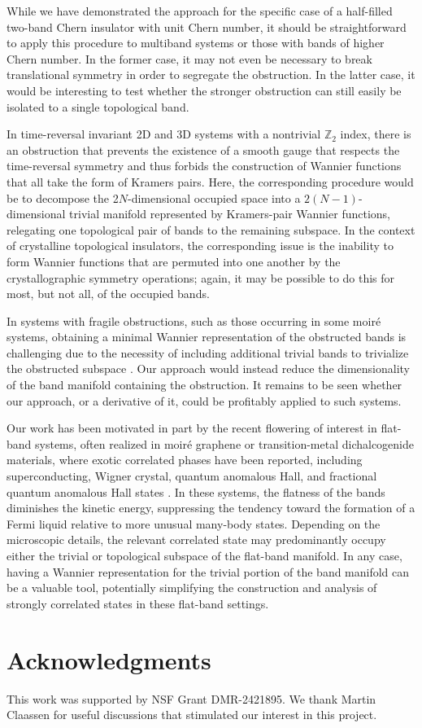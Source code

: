 \documentclass[galley,aps,pra,10pt,amsmath,amssymb,
    superscriptaddress,nofootinbib,longbibliography]{revtex4-2}
\begin{document}
While we have demonstrated the approach for the specific case of a half-filled two-band Chern insulator with unit Chern number, it should be straightforward to apply this procedure to multiband systems or those with bands of higher Chern number. In the former case, it may not even be necessary to break translational symmetry in order to segregate the obstruction. In the latter case, it would be interesting to test whether the stronger obstruction can still easily be isolated to a single topological band. 

In time-reversal invariant 2D and 3D systems with a nontrivial $\mathbb{Z}_2$ index, there is an obstruction that prevents the existence of a smooth gauge that respects the time-reversal symmetry and thus forbids the construction of Wannier functions that all take the form of Kramers pairs. Here, the corresponding procedure would be to decompose the 2$N$-dimensional occupied space into a $2(N-1)$-dimensional trivial manifold represented by Kramers-pair Wannier functions, relegating one topological pair of bands to the remaining subspace. In the context of crystalline topological insulators, the corresponding issue is the inability to form Wannier functions that are permuted into one another by the crystallographic symmetry operations; again, it may be possible to do this for most, but not all, of the occupied bands.

In systems with fragile obstructions, such as those occurring in some moir\'e systems, obtaining a minimal Wannier representation of the obstructed bands is challenging due to the necessity of including additional trivial bands to trivialize the obstructed subspace \cite{po2019}. Our approach would instead reduce the dimensionality of the band manifold containing the obstruction. It remains to be seen whether our approach, or a derivative of it, could be profitably applied to such systems.

Our work has been motivated in part by the recent flowering of interest in flat-band systems, often realized in moiré graphene or transition-metal dichalcogenide materials, where exotic correlated phases have been reported, including superconducting, Wigner crystal, quantum anomalous Hall, and fractional quantum anomalous Hall states \cite{Shayegan2022, siddharth2013, yang2024, zhao2012, kato2022, wu2007, Jaworowski2018, sheng2011}. In these systems, the flatness of the bands diminishes the kinetic energy, suppressing the tendency toward the formation of a Fermi liquid relative to more unusual many-body states. Depending on the microscopic details, the relevant correlated state may predominantly occupy either the trivial or topological subspace of the flat-band manifold. In any case, having a Wannier representation for the trivial portion of the band manifold can be a valuable tool, potentially simplifying the construction and analysis of strongly correlated states in these flat-band settings.


 \section*{Acknowledgments}

This work was supported by NSF Grant DMR-2421895. We thank Martin Claassen for useful discussions that stimulated our interest in this project.

\newpage

\end{document}
